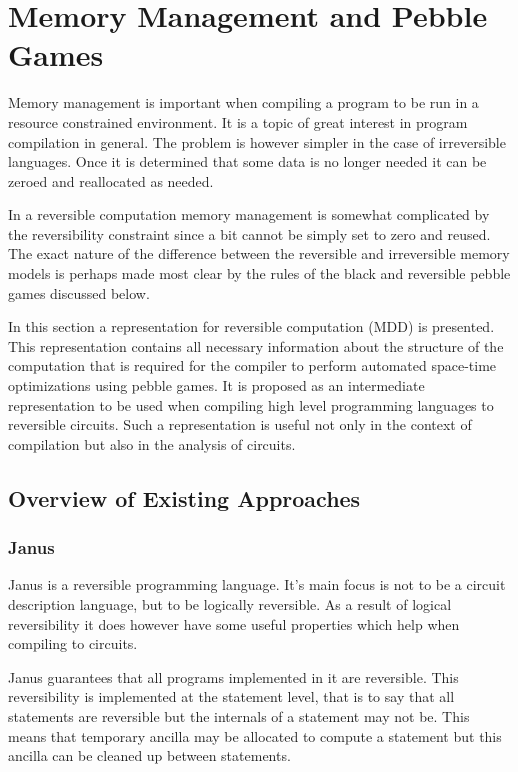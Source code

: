 \chapter{Memory Management and Pebble Games}

Memory management is important when compiling a program to be run in a resource
constrained environment. It is a topic of great interest in program compilation
in general. The problem is however simpler in the case of irreversible
languages. Once it is determined that some data is no longer needed it can be
zeroed and reallocated as needed.

In a reversible computation memory management is somewhat complicated by the
reversibility constraint since a bit cannot be simply set to zero and
reused\footnotemark. The exact nature of the difference between the reversible
and irreversible memory models is perhaps made most clear by the rules of the
black and reversible pebble games discussed below.


In this section a representation for reversible computation (MDD) is presented.
This representation contains all necessary information about the structure of
the computation that is required for the compiler to perform automated
space-time optimizations using pebble games. It is proposed as an
intermediate representation to be used when compiling high level programming
languages to reversible circuits.
Such a representation is useful not only in the context of compilation but also in the analysis of circuits.

\section{Overview of Existing Approaches}

\subsection{Janus\label{sec:janus}}

Janus\cite{YG:2007,LD:1982} is a reversible programming language.  It's main
focus is not to be a circuit description language, but to be logically
reversible. As a result of logical reversibility it does however have some
useful properties which help when compiling to circuits.

Janus guarantees that all programs implemented in it are reversible.
This reversibility is implemented at the statement level, that is to say that
all statements are reversible but the internals of a statement may not be.
This means that temporary ancilla may be allocated to compute a statement but
this ancilla can be cleaned up between statements.

